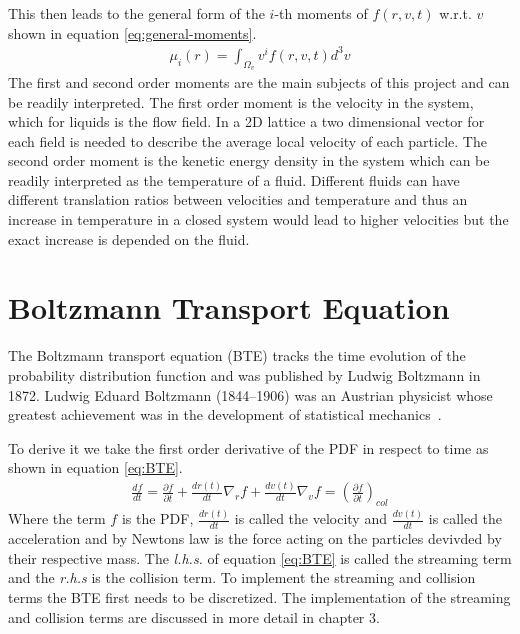 \documentclass[a4paper,12pt, oneside]{book}
\begin{document}
This then leads to the general form of the $i$-th moments of $ f(r,v,t) $ w.r.t. $ v $ shown in equation \ref{eq:general-moments}.
\begin{equation}
  \label{eq:general-moments}
  \begin{aligned}
    \mu_{i}(r) =\int_{\Omega_{v}}v^{i} f(r,v,t)d^{3}v
  \end{aligned}
\end{equation}
The first and second order moments are the main subjects of this project and can be readily interpreted.
The first order moment is the velocity in the system, which for liquids is the flow field.
In a 2D lattice a two dimensional vector for each field is needed to describe the average local velocity of each particle.
The second order moment is the kenetic energy density in the system which can be readily interpreted as the temperature of a fluid.
Different fluids can have different translation ratios between velocities and temperature and thus an increase in temperature in a closed system would lead to higher velocities but the exact increase is depended on the fluid.


\section{Boltzmann Transport Equation}
The Boltzmann transport equation (BTE) tracks the time evolution of the probability distribution function and was published by Ludwig Boltzmann in 1872. 
Ludwig Eduard Boltzmann (1844–1906) was an Austrian physicist whose greatest achievement was in the development of statistical mechanics~\cite{book}. 

To derive it we take the first order derivative of the PDF in respect to time as shown in
equation \ref{eq:BTE}.
\begin{equation}
  \label{eq:BTE}
  \begin{aligned}
    \frac{df}{dt} =\frac{\partial f}{\partial t} + \frac{dr(t)}{dt} \nabla_{r}f + \frac{dv(t)}{dt} \nabla_{v}f = \left( \frac{\partial f}{\partial t} \right)_{col}
  \end{aligned}
\end{equation}
Where the term $f$ is the PDF, $\frac{dr(t)}{dt}$ is called the velocity and $\frac{dv(t)}{dt}$ is called the acceleration and by Newtons law is the force acting on the particles devivded by their respective mass.
The \textit{l.h.s.} of equation \ref{eq:BTE} is called the streaming term and the \textit{r.h.s} is the collision term.
To implement the streaming and collision terms the BTE first needs to be discretized.
The implementation of the streaming and collision terms are discussed in more detail in chapter 3.
\end{document}

